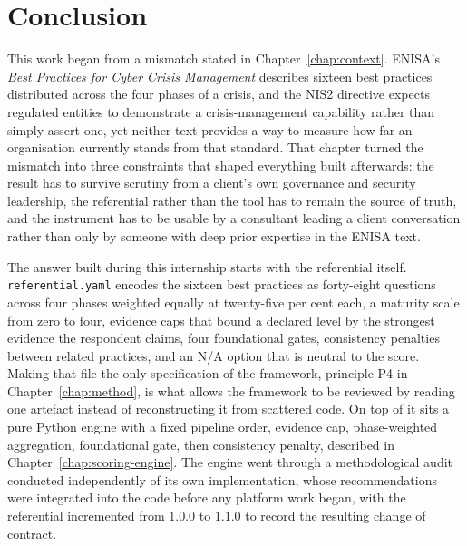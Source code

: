 \chapter*{Conclusion}
\label{chap:conclusion}

This work began from a mismatch stated in Chapter~\ref{chap:context}. ENISA's
\emph{Best Practices for Cyber Crisis Management} describes sixteen best
practices distributed across the four phases of a crisis, and the NIS2
directive expects regulated entities to demonstrate a crisis-management
capability rather than simply assert one, yet neither text provides a way to
measure how far an organisation currently stands from that standard. That
chapter turned the mismatch into three constraints that shaped everything built
afterwards: the result has to survive scrutiny from a client's own governance
and security leadership, the referential rather than the tool has to remain the
source of truth, and the instrument has to be usable by a consultant leading a
client conversation rather than only by someone with deep prior expertise in
the ENISA text.

The answer built during this internship starts with the referential itself.
\texttt{referential.\allowbreak yaml} encodes the sixteen best practices as
forty-eight questions across four phases weighted equally at twenty-five per
cent each, a maturity scale from zero to four, evidence caps that bound a
declared level by the strongest evidence the respondent claims, four
foundational gates, consistency penalties between related practices, and an
N/A option that is neutral to the score. Making that file the only
specification of the framework, principle P4 in Chapter~\ref{chap:method}, is
what allows the framework to be reviewed by reading one artefact instead of
reconstructing it from scattered code. On top of it sits a pure Python engine
with a fixed pipeline order, evidence cap, phase-weighted aggregation,
foundational gate, then consistency penalty, described in
Chapter~\ref{chap:scoring-engine}. The engine went through a methodological
audit conducted independently of its own implementation, whose recommendations
were integrated into the code before any platform work began, with the
referential incremented from 1.0.0 to 1.1.0 to record the resulting change of
contract.

